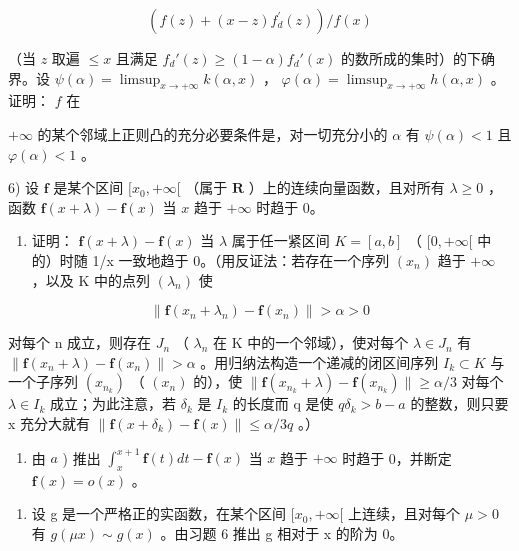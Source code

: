 \[
\left(f (z) + (x - z) f _ {d} ^ {\prime} (z)\right) / f (x)
\]

（当 \(z\) 取遍 \(\leqslant x\) 且满足 \(f_d'(z) \geqslant (1 - \alpha)f_d'(x)\) 的数所成的集时）的下确界。设 \(\psi(\alpha) = \limsup_{x \to +\infty} k(\alpha, x)\) ， \(\varphi(\alpha) = \limsup_{x \to +\infty} h(\alpha, x)\) 。证明： \(f\) 在

\(+\infty\) 的某个邻域上正则凸的充分必要条件是，对一切充分小的 \(\alpha\) 有 \(\psi(\alpha) < 1\) 且 \(\varphi(\alpha) < 1\) 。

6) 设 \(\mathbf{f}\) 是某个区间 \([x_0, +\infty[\) （属于 \(\mathbf{R}\) ）上的连续向量函数，且对所有 \(\lambda \geqslant 0\) ，函数 \(\mathbf{f}(x + \lambda) - \mathbf{f}(x)\) 当 \(x\) 趋于 \(+\infty\) 时趋于 0。

\begin{enumerate}
\def\labelenumi{\alph{enumi})}
\tightlist
\item
  证明： \(\mathbf{f}(x+\lambda)-\mathbf{f}(x)\) 当 \(\lambda\) 属于任一紧区间 \(K=[a,b]\) （ \([0,+\infty[\) 中的）时随 1/x 一致地趋于 0。（用反证法：若存在一个序列 \((x_{n})\) 趋于 \(+\infty\) ，以及 K 中的点列 \((\lambda_{n})\) 使
\end{enumerate}

\[
\| \mathbf {f} (x _ {n} + \lambda_ {n}) - \mathbf {f} (x _ {n}) \| > \alpha > 0
\]

对每个 n 成立，则存在 \(J_{n}\) （ \(\lambda_{n}\) 在 K 中的一个邻域），使对每个 \(\lambda \in J_{n}\) 有 \(\|\mathbf{f}(x_{n} + \lambda) - \mathbf{f}(x_{n})\| > \alpha\) 。用归纳法构造一个递减的闭区间序列 \(I_{k} \subset K\) 与一个子序列 \((x_{n_{k}})\) （ \((x_{n})\) 的），使 \(\|\mathbf{f}(x_{n_{k}} + \lambda) - \mathbf{f}(x_{n_{k}})\| \geqslant \alpha/3\) 对每个 \(\lambda \in I_{k}\) 成立；为此注意，若 \(\delta_{k}\) 是 \(I_{k}\) 的长度而 q 是使 \(q\delta_{k} > b - a\) 的整数，则只要 x 充分大就有 \(\|\mathbf{f}(x + \delta_{k}) - \mathbf{f}(x)\| \leqslant \alpha/3q\) 。）

\begin{enumerate}
\def\labelenumi{\alph{enumi})}
\setcounter{enumi}{1}
\tightlist
\item
  由 \(a\) ) 推出 \(\int_{x}^{x + 1}\mathbf{f}(t)dt - \mathbf{f}(x)\) 当 \(x\) 趋于 \(+\infty\) 时趋于 0，并断定 \(\mathbf{f}(x) = o(x)\) 。
\end{enumerate}

\begin{enumerate}
\def\labelenumi{\arabic{enumi})}
\setcounter{enumi}{6}
\tightlist
\item
  设 g 是一个严格正的实函数，在某个区间 \([x_{0}, +\infty[\) 上连续，且对每个 \(\mu > 0\) 有 \(g(\mu x) \sim g(x)\) 。由习题 6 推出 g 相对于 x 的阶为 0。
\end{enumerate}

